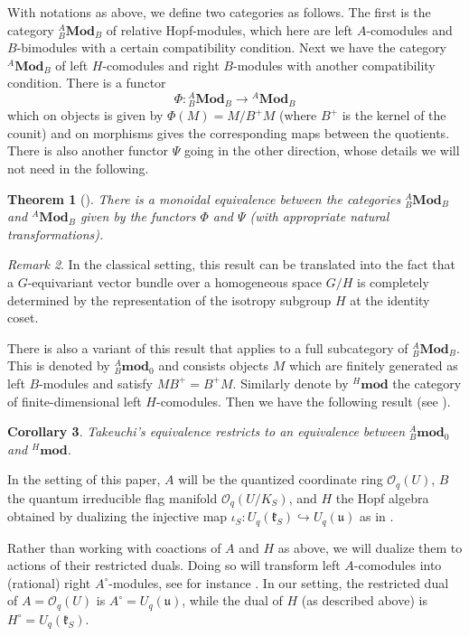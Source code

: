 \documentclass[a4paper,12pt,reqno,english]{amsart}
\numberwithin{equation}{section}
\numberwithin{figure}{section}
\theoremstyle{plain}
\newtheorem{theorem}{Theorem}[section]
\theoremstyle{plain}
\theoremstyle{plain}
\theoremstyle{plain}
\theoremstyle{plain}
\newtheorem{corollary}[theorem]{Corollary}
\theoremstyle{definition}
\theoremstyle{definition}
\theoremstyle{definition}
\theoremstyle{remark}
\newtheorem{remark}[theorem]{Remark}
\theoremstyle{definition}
\newcommand{\Uqu}{U_q(\mathfrak{u})}
\newcommand{\UqkS}{U_q(\mathfrak{k}_S)}
\newcommand{\OqU}{\mathcal{O}_q(U)}
\newcommand{\Oqflag}{\mathcal{O}_q(U / K_S)}
\newcommand{\catone}{{}^A_B \mathbf{Mod}_B}
\newcommand{\cattwo}{{}^A \mathbf{Mod}_B}
\newcommand{\catthree}{{}^A_B \mathbf{mod}_0}
\newcommand{\catfour}{{}^H \mathbf{mod}}
\begin{document}
With notations as above, we define two categories as follows.
The first is the category $\catone$ of relative Hopf-modules, which here are left $A$-comodules and $B$-bimodules with a certain compatibility condition.
Next we have the category $\cattwo$ of left $H$-comodules and right $B$-modules with another compatibility condition.
There is a functor
\[
\Phi: \catone \to \cattwo
\]
which on objects is given by $\Phi(M) = M / B^+ M$ (where $B^+$ is the kernel of the counit) and on morphisms gives the corresponding maps between the quotients.
There is also another functor $\Psi$ going in the other direction, whose details we will not need in the following.

\begin{theorem}[\cite{takeuchi}]
There is a monoidal equivalence between the categories $\catone$ and $\cattwo$ given by the functors $\Phi$ and $\Psi$ (with appropriate natural transformations).
\end{theorem}

\begin{remark}
In the classical setting, this result can be translated into the fact that a $G$-equivariant vector bundle over a homogeneous space $G / H$ is completely determined by the representation of the isotropy subgroup $H$ at the identity coset.
\end{remark}

There is also a variant of this result that applies to a full subcategory of $\catone$.
This is denoted by $\catthree$ and consists objects $M$ which are finitely generated as left $B$-modules and satisfy $M B^+ = B^+ M$.
Similarly denote by $\catfour$ the category of finite-dimensional left $H$-comodules.
Then we have the following result (see \cite[Theorem 2.6]{levicivita-irreducible}).

\begin{corollary}
Takeuchi's equivalence restricts to an equivalence between $\catthree$ and $\catfour$.
\end{corollary}

In the setting of this paper, $A$ will be the quantized coordinate ring $\OqU$, $B$ the quantum irreducible flag manifold $\Oqflag$, and $H$ the Hopf algebra obtained by dualizing the injective map $\iota_S: \UqkS \hookrightarrow \Uqu$ as in \cite[Section 6.2]{levicivita-irreducible}.

Rather than working with coactions of $A$ and $H$ as above, we will dualize them to actions of their restricted duals.
Doing so will transform left $A$-comodules into (rational) right $A^\circ$-modules, see for instance \cite[Theorem 2.2.5]{hopf-book}.
In our setting, the restricted dual of $A = \OqU$ is $A^\circ = \Uqu$, while the dual of $H$ (as described above) is $H^\circ = \UqkS$.
\end{document}
